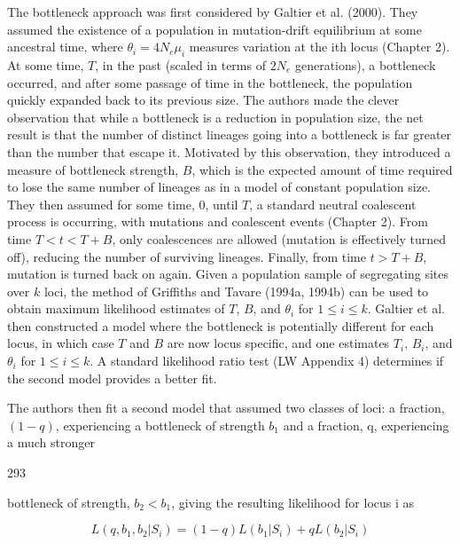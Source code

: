 \documentclass{article}
\begin{document}
The bottleneck approach was first considered by Galtier et al. (2000). They assumed the existence of a population in mutation-drift equilibrium at some ancestral time, where  $ \theta_i = 4N_e\mu_i $ measures variation at the ith locus (Chapter 2). At some time,  $ T $, in the past (scaled in terms of  $ 2N_e $ generations), a bottleneck occurred, and after some passage of time in the bottleneck, the population quickly expanded back to its previous size. The authors made the clever observation that while a bottleneck is a reduction in population size, the net result is that the number of distinct lineages going into a bottleneck is far greater than the number that escape it. Motivated by this observation, they introduced a measure of bottleneck strength,  $ B $, which is the expected amount of time required to lose the same number of lineages as in a model of constant population size. They then assumed for some time, 0, until  $ T $, a standard neutral coalescent process is occurring, with mutations and coalescent events (Chapter 2). From time  $ T < t < T + B $, only coalescences are allowed (mutation is effectively turned off), reducing the number of surviving lineages. Finally, from time  $ t > T + B $, mutation is turned back on again. Given a population sample of segregating sites over  $ k $ loci, the method of Griffiths and Tavare (1994a, 1994b) can be used to obtain maximum likelihood estimates of  $ T $,  $ B $, and  $ \theta_i $ for  $ 1 \leq i \leq k $. Galtier et al. then constructed a model where the bottleneck is potentially different for each locus, in which case  $ T $ and  $ B $ are now locus specific, and one estimates  $ T_i $,  $ B_i $, and  $ \theta_i $ for  $ 1 \leq i \leq k $. A standard likelihood ratio test (LW Appendix 4) determines if the second model provides a better fit.

The authors then fit a second model that assumed two classes of loci: a fraction,  $ (1 - q) $, experiencing a bottleneck of strength  $ b_{1} $ and a fraction, q, experiencing a much stronger

293

bottleneck of strength,  $ b_{2} < b_{1} $, giving the resulting likelihood for locus i as

\begin{equation}
L(q,b_{1},b_{2}|S_{i})=(1-q)L(b_{1}|S_{i})+q L(b_{2}|S_{i})
\tag{9.15a}
\label{eq:9_15a}
\end{equation}
\end{document}
